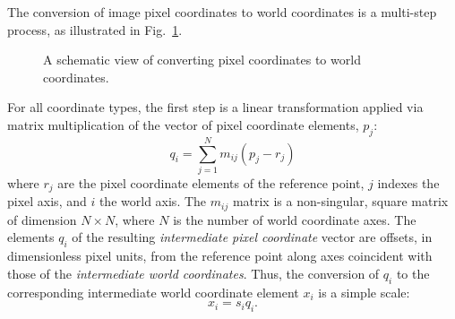 \documentclass[onecolumn]{aa}
\begin{document}
The conversion of image pixel coordinates to world coordinates is a multi-step
process, as illustrated in Fig.~\ref{fig:px2wld}.  

\begin{figure}[t]
\begin{center}
\leavevmode
\epsfysize=9.0cm
\caption{A schematic view of converting pixel coordinates to world coordinates.}
\label{fig:px2wld}
\end{center}
\end{figure}
%

For all coordinate types, the first step is a linear
transformation applied via matrix multiplication of the vector of 
pixel coordinate elements, $p_j$:  
\begin{equation}
q_i = \sum_{j=1}^{N} m_{ij} (p_j - r_j)  \label{eq:pix2intpix}
\end{equation}
where $r_j$ are the pixel coordinate
elements of the reference point, $j$ indexes the pixel axis, and $i$ the world
axis. The $m_{ij}$ matrix is a non-singular, square matrix of dimension 
$N\times N$, where $N$ is the number of world coordinate axes.  
The elements $q_i$ of the resulting
\textit{intermediate pixel coordinate} vector are offsets, in dimensionless pixel
units, from the reference point along axes coincident with those of the
\textit{intermediate world coordinates}. Thus, the conversion of $q_i$ to the
corresponding intermediate world coordinate element $x_i$ is a simple scale:
\begin{equation} 
x_i = s_iq_i.  \label{eq:intpix2intworld} 
\end{equation}
\end{document}
